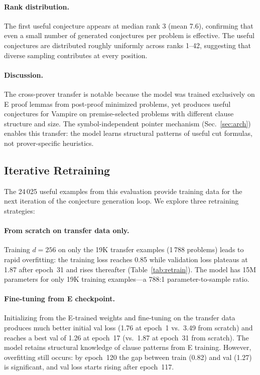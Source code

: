 \documentclass{easychair}
\newcommand{\Eprover}{E\xspace}
\newcommand{\Vampire}{Vampire\xspace}
\begin{document}
\paragraph{Rank distribution.}
The first useful conjecture appears at median rank 3 (mean 7.6),
confirming that even a small number of generated conjectures per
problem is effective.  The useful conjectures are distributed
roughly uniformly across ranks 1--42, suggesting that diverse
sampling contributes at every position.

\paragraph{Discussion.}
The cross-prover transfer is notable because the model was trained
exclusively on \Eprover proof lemmas from post-proof minimized
problems, yet produces useful conjectures for \Vampire on
premise-selected problems with different clause structure and size.
The symbol-independent pointer mechanism (Sec.~\ref{sec:arch})
enables this transfer: the model learns structural patterns of
useful cut formulas, not prover-specific heuristics.

\subsection{Iterative Retraining}

The 24\,025 useful examples from this evaluation provide training
data for the next iteration of the conjecture generation loop.
We explore three retraining strategies:

\paragraph{From scratch on transfer data only.}
Training $d{=}256$ on only the 19K transfer examples (1\,788
problems) leads to rapid overfitting: the training loss reaches
0.85 while validation loss plateaus at 1.87 after epoch~31 and
rises thereafter (Table~\ref{tab:retrain}).  The model has 15M
parameters for only 19K training examples---a 788:1 parameter-to-sample
ratio.

\paragraph{Fine-tuning from E checkpoint.}
Initializing from the \Eprover-trained weights and fine-tuning on
the transfer data produces much better initial val loss (1.76 at
epoch~1 vs.\ 3.49 from scratch) and reaches a best val of 1.26 at
epoch~17 (vs.\ 1.87 at epoch~31 from scratch).  The model retains
structural knowledge of clause patterns from \Eprover training.
However, overfitting still occurs: by epoch~120 the gap between
train (0.82) and val (1.27) is significant, and val loss starts
rising after epoch~117.
\end{document}
